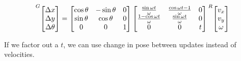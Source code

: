 \begin{equation}
  \prescript{G}{}{\begin{bmatrix}
    \Delta x \\
    \Delta y \\
    \Delta \theta
  \end{bmatrix}} =
  \begin{bmatrix}
    \cos\theta & -\sin\theta & 0 \\
    \sin\theta &  \cos\theta & 0 \\
             0 &           0 & 1
  \end{bmatrix}
  \begin{bmatrix}
    \frac{\sin\omega t}{\omega} & \frac{\cos\omega t - 1}{\omega} & 0 \\
    \frac{1 - \cos\omega t}{\omega} & \frac{\sin\omega t}{\omega} & 0 \\
    0 & 0 & t
  \end{bmatrix}
  \prescript{R}{}{\begin{bmatrix}
    v_x \\
    v_y \\
    \omega
  \end{bmatrix}}
  \label{eq:se2_exp_vel}
\end{equation}

If we factor out a $t$, we can use change in pose between updates instead of
velocities.

